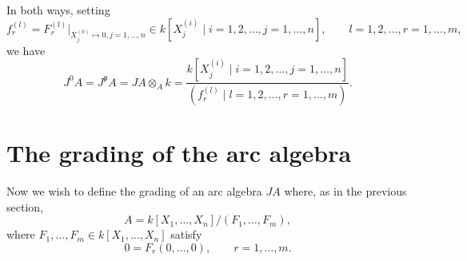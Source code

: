 \documentclass[a4paper, 12pt]{amsart}
\theoremstyle{remark}
\begin{document}
In both ways, setting
\begin{equation*}
  f^{(l)}_r = F_r^{(l)}|_{X^{(0)}_j \mapsto 0, j = 1, \dots, n} \in k[X^{(i)}_j \mid i = 1, 2, \dots, j = 1, \dots, n], \qquad l = 1, 2, \dots, r = 1, \dots, m,
\end{equation*}
we have
\begin{equation}
  \label{eq:9}
  J^0 A = J^\mathfrak{p} A = J A \otimes_A k = \frac{k[X^{(i)}_j \mid i = 1, 2, \dots, j = 1, \dots, n]}{(f^{(l)}_r \mid l = 1, 2, \dots, r = 1, \dots, m)}.
\end{equation}

\section{The grading of the arc algebra}
\label{sec:grading-arc-algebra}

Now we wish to define the grading of an arc algebra $J A$ where, as in the previous section,
\begin{equation*}
  A = k[X_1, \dots, X_n]/(F_1, \dots, F_m),
\end{equation*}
where $F_1, \dots, F_m \in k[X_1, \dots, X_n]$ satisfy
\begin{equation*}
  0 = F_r(0, \dots, 0), \qquad r = 1, \dots, m.
\end{equation*}
\end{document}
